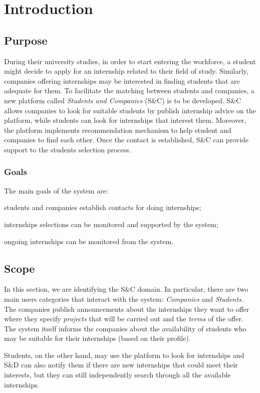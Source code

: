 \chapter{Introduction}
	\section{Purpose}
		During their university studies, in order to start entering the workforce, a student might decide to apply for an internship related to their field of study. Similarly, companies offering internships may be interested in finding students that are adequate for them. To facilitate the matching between students and companies, a new platform called \emph{Students and Companies} (S\&C) is to be developed. S\&C allows companies to look for suitable students by publish internship advice on the platform, while students can look for internships that interest them. Moreover, the platform implements recommendation mechanism to help student and companies to find each other. Once the contact is established, S\&C can provide support to the students selection process.
		\subsection{Goals}
			The main goals of the system are:
			
			\quad [G1]\quad students and companies establish contacts for doing internships;
			
			\quad [G2]\quad internships selections can be monitored and supported by the system;
			
			\quad [G3]\quad ongoing internships can be monitored from the system.
	\section{Scope}
		In this section, we are identifying the S\&C domain. In particular, there are two main users categories that interact with the system: \emph{Companies} and \emph{Students}. The companies publish announcements about the internships they want to offer where they specify \emph{projects} that will be carried out and the \emph{terms} of the offer. The system itself informs the companies about the availability of students who may be suitable for their internships (based on their profile).
		
		Students, on the other hand, may use the platform to look for internships and S\&D can also notify them if there are new internships that could meet their interests, but they can still independently search through all the available internships.
		
